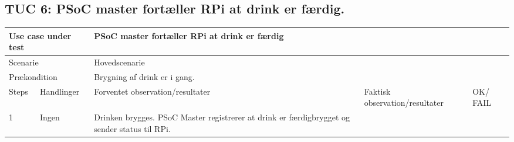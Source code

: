 \subsection{TUC 6: PSoC master fortæller RPi at drink er færdig.}

\begin{table}[H]
\begin{tabular}{|p{1cm}|p{4cm}|p{4cm}|p{4cm}|p{1cm}|}
\hline
\multicolumn{2}{|p{5cm}|}{Use case under test} & \multicolumn{3}{p{9cm}|}{PSoC master fortæller RPi at drink er færdig}                                       \\ \hline
\multicolumn{2}{|p{5cm}|}{Scenarie}            & \multicolumn{3}{p{9cm}|}{Hovedscenarie}                                          \\ \hline
\multicolumn{2}{|p{5cm}|}{Prækondition}        & \multicolumn{3}{p{9cm}|}{Brygning af drink er i gang.}                                 \\ \hline
Steps               & Handlinger          & Forventet observation/resultater & Faktisk observation/resultater & OK/ FAIL \\ \hline
1    & Ingen  &   Drinken brygges. PSoC Master registrerer at drink er færdigbrygget og sender status til RPi. &   &         \\ \hline

\end{tabular}
\end{table}